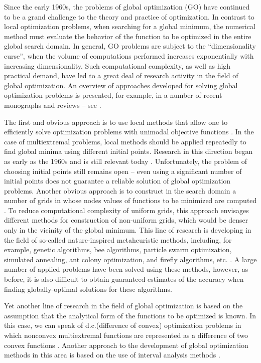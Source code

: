 \documentclass[review]{elsarticle}
\begin{document}
Since the early 1960s, the problems of global optimization (GO) have continued to be a grand challenge to the theory and practice of optimization. In contrast to local optimization problems, when searching for a global minimum, the numerical method must evaluate the behavior of the function to be optimized in the entire global search domain. In general, GO problems are subject to the ``dimensionality curse'', when the volume of computations performed increases exponentially with increasing dimensionality. Such computational complexity, as well as high practical demand, have led to a great deal of research activity in the field of global optimization. An overview of approaches developed for solving global optimization problems is presented, for example, in a number of recent monographs and reviews -- see \cite{c1,c2,c3,c4,c5,c6,c7,c8,c9}.

The first and obvious approach is to use local methods that allow one to efficiently solve optimization problems with unimodal objective functions \cite{c1}. In the case of multiextremal problems, local methods should be applied repeatedly to find global minima using different initial points. Research in this direction began as early as the 1960s and is still relevant today \cite{c10,c11,c12}. Unfortunately, the problem of choosing initial points still remains open -- even using a significant number of initial points does not guarantee a reliable solution of global optimization problems. Another obvious approach is to construct in the search domain  a number of grids in whose nodes values of functions to be minimized are computed \cite{c2,c3,c4,c5}. To reduce computational complexity of uniform grids, this approach envisages different methods for construction of non-uniform grids, which would be denser only in the vicinity of the global minimum. This line of research is developing in the field of so-called nature-inspired metaheuristic methods, including, for example, genetic algorithms, bee algorithms, particle swarm optimization, simulated annealing, ant colony optimization, and firefly algorithms, etc. \cite{c4,c13,c14,c15}. A large number of applied problems have been solved using these methods, however, as before, it is also difficult to obtain guaranteed estimates of the accuracy when finding globally-optimal solutions for these algorithms.

Yet another line of research in the field of global optimization is based on the assumption that the analytical form of the functions to be optimized is known. In this case, we can speak of d.c.(difference of convex) optimization problems in which nonconvex multiextremal functions are represented as a difference of two convex functions \cite{c16,c17}. Another approach to the development of global optimization methods in this area is based on the use of interval analysis methods \cite{c18}.
\end{document}
